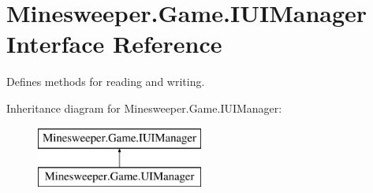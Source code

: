 \hypertarget{interface_minesweeper_1_1_game_1_1_i_u_i_manager}{\section{Minesweeper.\+Game.\+I\+U\+I\+Manager Interface Reference}
\label{interface_minesweeper_1_1_game_1_1_i_u_i_manager}
}


Defines methods for reading and writing.  


Inheritance diagram for Minesweeper.\+Game.\+I\+U\+I\+Manager\+:\begin{figure}[H]
\begin{center}
\leavevmode
\includegraphics[height=2.000000cm]{interface_minesweeper_1_1_game_1_1_i_u_i_manager}
\end{center}
\end{figure}
